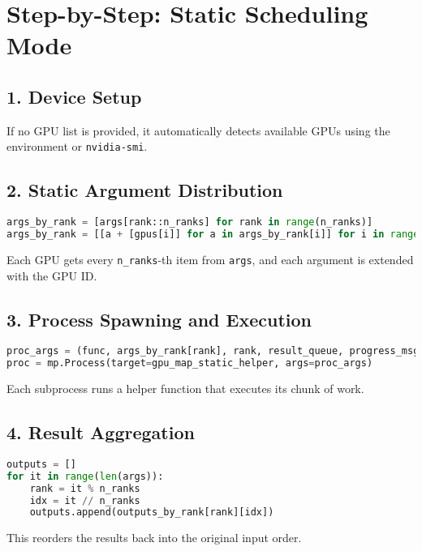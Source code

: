 \documentclass{article}
\begin{document}
\section*{Step-by-Step: Static Scheduling Mode}

\subsection*{1. Device Setup}
If no GPU list is provided, it automatically detects available GPUs using the environment or \texttt{nvidia-smi}.

\subsection*{2. Static Argument Distribution}

\begin{lstlisting}[language=Python]
args_by_rank = [args[rank::n_ranks] for rank in range(n_ranks)]
args_by_rank = [[a + [gpus[i]] for a in args_by_rank[i]] for i in range(n_ranks)]
\end{lstlisting}

Each GPU gets every \texttt{n\_ranks}-th item from \texttt{args}, and each argument is extended with the GPU ID.

\subsection*{3. Process Spawning and Execution}

\begin{lstlisting}[language=Python]
proc_args = (func, args_by_rank[rank], rank, result_queue, progress_msg)
proc = mp.Process(target=gpu_map_static_helper, args=proc_args)
\end{lstlisting}

Each subprocess runs a helper function that executes its chunk of work.

\subsection*{4. Result Aggregation}

\begin{lstlisting}[language=Python]
outputs = []
for it in range(len(args)):
    rank = it % n_ranks
    idx = it // n_ranks
    outputs.append(outputs_by_rank[rank][idx])
\end{lstlisting}

This reorders the results back into the original input order.
\end{document}
